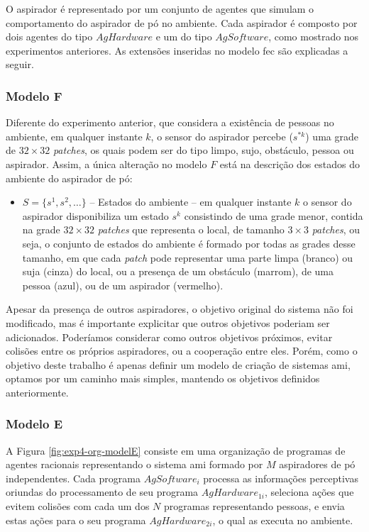 O aspirador é representado por um conjunto de agentes que simulam o comportamento do aspirador de pó no ambiente. Cada aspirador é composto por dois agentes do tipo $AgHardware$ e um do tipo $AgSoftware$, como mostrado nos experimentos anteriores. As extensões inseridas no modelo \acrshort{fec} são explicadas a seguir.

\subsubsection{Modelo F}

Diferente do experimento anterior, que considera a existência de pessoas no ambiente, em qualquer instante $k$, o sensor do aspirador percebe ($s^{*k}$) uma grade de $32 \times 32$ \textit{patches}, os quais podem ser do tipo limpo, sujo, obstáculo, pessoa ou aspirador. Assim, a única alteração no modelo $F$ está na descrição dos estados do ambiente do aspirador de pó: 

\begin{itemize}
    \item $S = \{s^1, s^2, \ldots\}$ -- Estados do ambiente – em qualquer instante $k$ o sensor do aspirador disponibiliza um estado $s^k$ consistindo de uma grade menor, contida na grade $32 \times 32$ \textit{patches} que representa o local, de tamanho $3 \times 3$ \textit{patches}, ou seja, o conjunto de estados do ambiente é formado por todas as grades desse tamanho, em que cada \textit{patch} pode representar uma parte limpa (branco) ou suja (cinza) do local, ou a presença de um obstáculo (marrom), de uma pessoa (azul), ou de um aspirador (vermelho).
\end{itemize}

Apesar da presença de outros aspiradores, o objetivo original do sistema não foi modificado, mas é importante explicitar que outros objetivos poderiam ser adicionados. Poderíamos considerar como outros objetivos próximos, evitar colisões entre os próprios aspiradores, ou a cooperação entre eles. Porém, como o objetivo deste trabalho é apenas definir um modelo de criação de sistemas \acrshort{ami}, optamos por um caminho mais simples, mantendo os objetivos definidos anteriormente. 

\subsubsection{Modelo E}

A Figura \ref{fig:exp4-org-modelE} consiste em uma organização de programas de agentes racionais representando o sistema \acrshort{ami} formado por $M$ aspiradores de pó independentes. Cada programa $AgSoftware_i$ processa as informações perceptivas oriundas do processamento de seu programa $AgHardware_{1i}$, seleciona ações que evitem colisões com cada um dos $N$ programas representando pessoas, e envia estas ações para o seu programa $AgHardware_{2i}$, o qual as executa no ambiente.

